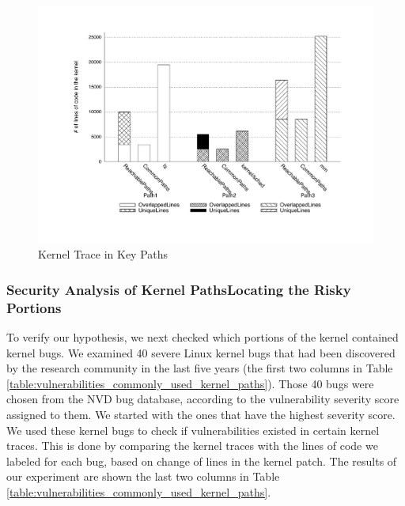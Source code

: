 \begin{figure}
\centering
\includegraphics[width=1.0\columnwidth]{diagram/lind_oakland16_diagram_02.pdf}
\caption{Kernel Trace in Key Paths}
\label{fig:key_paths_trace}
\end{figure}

\subsubsection{Security Analysis of Kernel Paths\textendash Locating the
Risky Portions}

To verify our hypothesis, we next checked which portions of
the kernel contained kernel bugs. We examined 40 severe Linux kernel
bugs that had been discovered by the research community in the last five
years (the first two columns in Table 
\ref{table:vulnerabilities_commonly_used_kernel_paths}). 
Those 40 bugs were chosen from the NVD bug database, according to 
the vulnerability severity score assigned to them. We started with the ones 
that have the highest severity score. 
We used these kernel bugs to check if vulnerabilities existed in certain
kernel traces. This is done by comparing the kernel traces with the lines 
of code we labeled for each bug, based on change of lines in the 
kernel patch.   
The results of our experiment are shown the last two columns in Table
\ref{table:vulnerabilities_commonly_used_kernel_paths}.

